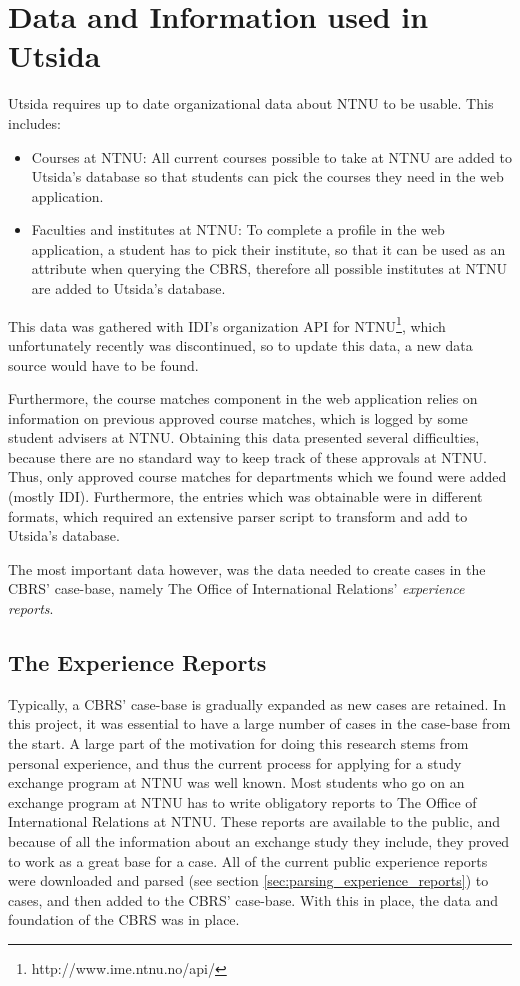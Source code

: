 \section{Data and Information used in Utsida}
Utsida requires up to date organizational data about NTNU to be usable. This includes:

\begin{itemize}
    \item Courses at NTNU: All current courses possible to take at NTNU are added to Utsida's database so that students can pick the courses they need in the web application.
    \item Faculties and institutes at NTNU: To complete a profile in the web application, a student has to pick their institute, so that it can be used as an attribute when querying the CBRS, therefore all possible institutes at NTNU are added to Utsida's database.
\end{itemize}

This data was gathered with IDI's organization API for NTNU\footnote{http://www.ime.ntnu.no/api/}, which unfortunately recently was discontinued, so to update this data, a new data source would have to be found. 

Furthermore, the course matches component in the web application relies on information on previous approved course matches, which is logged by some student advisers at NTNU. Obtaining this data presented several difficulties, because there are no standard way to keep track of these approvals at NTNU. Thus, only approved course matches for departments which we found were added (mostly IDI). Furthermore, the entries which was obtainable were in different formats, which required an extensive parser script to transform and add to Utsida's database.

The most important data however, was the data needed to create cases in the CBRS' case-base, namely The Office of International Relations' \textit{experience reports}.

\subsection{The Experience Reports}\label{sec:experience_reports}
Typically, a CBRS' case-base is gradually expanded as new cases are retained. In this project, it was essential to have a large number of cases in the case-base from the start. A large part of the motivation for doing this research stems from personal experience, and thus the current process for applying for a study exchange program at NTNU was well known. Most students who go on an exchange program at NTNU has to write obligatory reports to The Office of International Relations at NTNU. These reports are available to the public, and because of all the information about an exchange study they include, they proved to work as a great base for a case. All of the current public experience reports were downloaded and parsed (see section \ref{sec:parsing_experience_reports}) to cases, and then added to the CBRS' case-base. With this in place, the data and foundation of the CBRS was in place.

